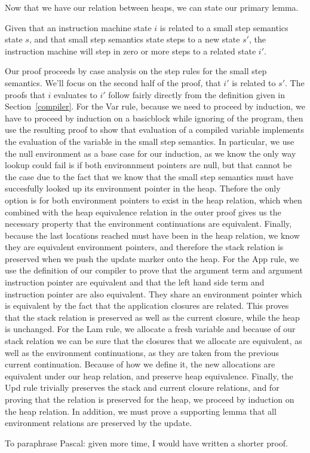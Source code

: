Now that we have our relation between heaps, we can state our primary lemma.
\begin{lemma}
Given that an instruction machine state $i$ is related to a small step
semantics state $s$, and that small step semantics state steps to a new state
$s'$, the instruction machine will step in zero or more steps to a related state
$i'$.
\end{lemma}
\begin{proofoutline}
Our proof proceeds by case analysis on the step rules for the small step
semantics. We'll focus on the second half of the proof, that $i'$ is related to
$s'$. The proofs that $i$ evaluates to $i'$ follow fairly directly from the
definition given in Section~\ref{compiler}. For the Var rule, because we need to
proceed by induction, we have to proceed by induction on a basicblock while
ignoring of the program, then use the resulting proof to show that evaluation of
a compiled variable implements the evaluation of the variable in the small step
semantics. In particular, we use the null environment as a base case for our
induction, as we know the only way lookup could fail is if both environnment
pointers are null, but that cannot be the case due to the fact that we know that
the small step semantics must have succesfully looked up its environment pointer
in the heap. Thefore the only option is for both environment pointers to exist
in the heap relation, which when combined with the heap equivalence relation in
the outer proof gives us the necessary property that the environment
continuations are equivalent. Finally, because the last locations reached must
have been in the heap relation, we know they are equivalent environment
pointers, and therefore the stack relation is preserved when we push the update
marker onto the heap. For the App rule, we use the definition of our compiler to
prove that the argument term and argument instruction pointer are equivalent and
that the left hand side term and instruction pointer are also equivalent. They
share an environment pointer which is equivalent by the fact that the
application closures are related. This proves that the stack relation is
preserved as well as the current closure, while the heap is unchanged. For the
Lam rule, we allocate a fresh variable and because of our stack relation we can
be sure that the closures that we allocate are equivalent, as well as the
environment continuations, as they are taken from the previous current
continuation. Because of how we define it, the new allocations are equivalent
under our heap relation, and preserve heap equivalence. Finally, the Upd rule
trivially preserves the stack and current closure relations, and for proving
that the relation is preserved for the heap, we proceed by induction on the heap
relation. In addition, we must prove a supporting lemma that all environment
relations are preserved by the update. 
\end{proofoutline}

To paraphrase Pascal: given more time, I would have written a shorter proof.

